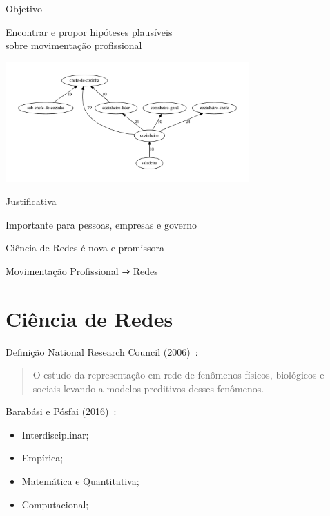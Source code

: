 \documentclass[10pt, hyperref={pdfpagelabels=false}]{beamer}
\begin{document}
{
\begin{frame}[c, label=objetivo]{Objetivo}
  \begin{center}
    \Large
    Encontrar e propor \alert{hipóteses} plausíveis\\
    sobre movimentação profissional
    
    \includegraphics[width=0.7\textwidth]{subcluster_01_11}
  \end{center}
\end{frame}

\begin{frame}[fragile, label=justificativa]{Justificativa}
  \begin{center}
    \Large
    Importante para \alert{pessoas}, \alert{empresas} e \alert{governo}
    
    \vspace{\baselineskip}
    
    Ciência de Redes é \alert{nova} e \alert{promissora}
    
    \vspace{\baselineskip}
    
    Movimentação Profissional ⇒ Redes
  \end{center}
\end{frame}
}

\section{Ciência de Redes}

\begin{frame}[label=definicao]{Definição}
  National Research Council (2006)~\cite{National_Research_Council2006-lv}:
  \begin{quote}
    O estudo da representação em rede de fenômenos físicos, biológicos e sociais levando a modelos preditivos desses fenômenos.
  \end{quote}
  Barabási e Pósfai (2016)~\cite{Barabasi2016-rn}:
  \begin{itemize}
    \item Interdisciplinar;
    \item Empírica;
    \item Matemática e Quantitativa;
    \item Computacional;
  \end{itemize}
\end{frame}
\end{document}
